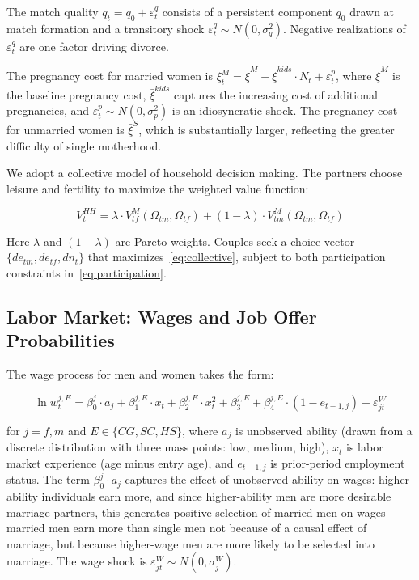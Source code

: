 \documentclass[12pt]{article}
\begin{document}
The match quality $q_t = q_0 + \varepsilon_t^q$ consists of a persistent component $q_0$ drawn at match formation and a transitory shock $\varepsilon_t^q \sim N(0, \sigma_q^2)$. Negative realizations of $\varepsilon_t^q$ are one factor driving divorce.

The pregnancy cost for married women is $\xi_t^M = \bar{\xi}^M + \bar{\xi}^{kids} \cdot N_t + \varepsilon_t^p$, where $\bar{\xi}^M$ is the baseline pregnancy cost, $\bar{\xi}^{kids}$ captures the increasing cost of additional pregnancies, and $\varepsilon_t^p \sim N(0, \sigma_p^2)$ is an idiosyncratic shock. The pregnancy cost for unmarried women is $\bar{\xi}^S$, which is substantially larger, reflecting the greater difficulty of single motherhood.

We adopt a collective model of household decision making. The partners choose leisure and fertility to maximize the weighted value function:

\begin{equation}
V_t^{HH} = \lambda \cdot V_{tf}^M(\Omega_{tm}, \Omega_{tf}) + (1 - \lambda) \cdot V_{tm}^M(\Omega_{tm}, \Omega_{tf})
\label{eq:collective}
\end{equation}

Here $\lambda$ and $(1 - \lambda)$ are Pareto weights. Couples seek a choice vector $\{de_{tm}, de_{tf}, dn_t\}$ that maximizes~\eqref{eq:collective}, subject to both participation constraints in~\eqref{eq:participation}.

\subsection{Labor Market: Wages and Job Offer Probabilities}

The wage process for men and women takes the form:

\begin{equation}
\ln w_t^{j,E} = \beta_0^j \cdot a_j + \beta_1^{j,E} \cdot x_t + \beta_2^{j,E} \cdot x_t^2 + \beta_3^{j,E} + \beta_4^{j,E} \cdot (1 - e_{t-1,j}) + \varepsilon_{jt}^W
\label{eq:wage}
\end{equation}

for $j = f, m$ and $E \in \{CG, SC, HS\}$, where $a_j$ is unobserved ability (drawn from a discrete distribution with three mass points: low, medium, high), $x_t$ is labor market experience (age minus entry age), and $e_{t-1,j}$ is prior-period employment status. The term $\beta_0^j \cdot a_j$ captures the effect of unobserved ability on wages: higher-ability individuals earn more, and since higher-ability men are more desirable marriage partners, this generates positive selection of married men on wages---married men earn more than single men not because of a causal effect of marriage, but because higher-wage men are more likely to be selected into marriage. The wage shock is $\varepsilon_{jt}^W \sim N(0, \sigma_j^W)$.
\end{document}
